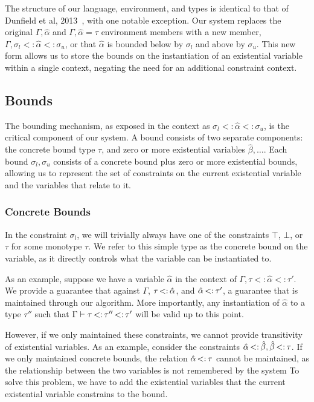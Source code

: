 \documentclass{sig-alternate}
\newcommand{\st}{\ensuremath{\hspace{-1px}<:\hspace{-1px}}}
\newcommand{\alphahat}{\hat{\alpha}}
\newcommand{\botbound}{\sigma_{l}}
\newcommand{\topbound}{\sigma_{u}}
\newcommand{\tst}{{\scriptstyle{<:}}}
\newcommand{\bound}[3]{#1 \tst #2 \tst #3}
\begin{document}
The structure of our language, environment, and types is identical to that of Dunfield et al, 2013~\cite{Dunfield:2013:CEB:2544174.2500582}, with one notable exception. Our system replaces the original $\Gamma, \hat{\alpha}$ and $\Gamma, \hat{\alpha}=\tau$ environment members with a new member, $\Gamma, \bound{\botbound }{\hat{\alpha}}{\topbound}$, or that $\alphahat$ is bounded below by $\botbound$ and above by $\topbound$. This new form allows us to store the bounds on the instantiation of an existential variable within a single context, negating the need for an additional constraint context.

\subsection{Bounds}
The bounding mechanism, as exposed in the context as $\bound{\botbound}{\hat{\alpha}}{\topbound}$, is the critical component of our system. A bound consists of two separate components: the concrete bound type $\tau$, and zero or more existential variables $\hat{\beta}, \ldots$. Each bound $\botbound,\topbound$ consists of a concrete bound plus zero or more existential bounds, allowing us to represent the set of constraints on the current existential variable and the variables that relate to it.


\subsubsection{Concrete Bounds}
In the constraint $\botbound$, we will trivially always have one of the constraints $\top$, $\bot$, or $\tau$ for some monotype $\tau$. We refer to this simple type as the concrete bound on the variable, as it directly controls what the variable can be instantiated to.

As an example, suppose we have a variable $\hat{\alpha}$ in the context of $\Gamma, \bound{\tau}{\hat{\alpha}}{\tau'}$. We provide a guarantee that against $\Gamma$, $\tau \st \hat{\alpha}$, and $\hat{\alpha} \st \tau'$, a guarantee that is maintained through our algorithm. More importantly, any instantiation of $\alphahat$ to a type $\tau''$ such that $\Gamma \vdash \tau \st \tau'' \st \tau'$ will be valid up to this point.

However, if we only maintained these constraints, we cannot provide transitivity of existential variables. As an example, consider the constraints $\hat{\alpha} \st \hat{\beta}, \hat{\beta} \st \tau$. If we only maintained concrete bounds, the relation $\hat{\alpha} \st \tau$ cannot be maintained, as the relationship between the two variables is not remembered by the system To solve this problem, we have to add the existential variables that the current existential variable constrains to the bound.
\end{document}
